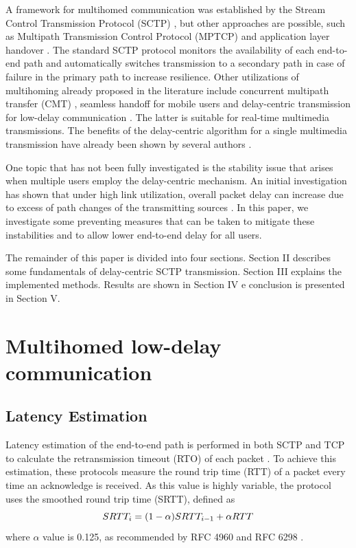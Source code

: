 \documentclass[letterpaper,10pt,oneside,conference,final]{sbrt2015}
\begin{document}
A framework for multihomed communication was established by the Stream Control Transmission Protocol (SCTP) \cite{Stewart2007a}, but other approaches are possible, such as Multipath Transmission Control Protocol (MPTCP) \cite{Ford2013}\cite{Zekri2012} and application layer handover \cite{Cunningham2004}. The standard SCTP protocol monitors the availability of each end-to-end path and automatically switches transmission to a secondary path in case of failure in the primary path to increase resilience. Other utilizations of multihoming already proposed in the literature include concurrent multipath transfer (CMT) \cite{Casetti2004}\cite{Ye2004}\cite{Iyengar2006}, seamless handoff for mobile users \cite{Koh2004}\cite{Ma2004} and delay-centric transmission for low-delay communication \cite{Kelly2004}\cite{Kashihara2004}. The latter is suitable for real-time multimedia transmissions.
The benefits of the delay-centric algorithm for a single multimedia transmission have already been shown by several authors \cite{Noonan2004b}\cite{Fitzpatrick2007}\cite{Gavriloff2009a}\cite{Runcos2010}. 

One topic that has not been fully investigated is the stability issue that arises when multiple users employ the delay-centric mechanism. An initial investigation has shown that under high link utilization, overall packet delay can increase due to excess of path changes of the transmitting sources \cite{Gavriloff2009}.
In this paper, we investigate some preventing measures that can be taken to mitigate these instabilities and to allow lower end-to-end delay for all users.

The remainder of this paper is divided into four sections. Section II describes some fundamentals of delay-centric SCTP transmission. Section III explains the implemented methods. Results are shown in Section IV e conclusion is presented in Section V.  

  \section{Multihomed low-delay communication}
  
  \subsection{Latency Estimation}

  Latency estimation of the end-to-end path is performed in both SCTP and TCP to calculate the retransmission timeout (RTO) of each packet \cite{Stewart2007a}\cite{Postel1981}. To achieve this estimation, these protocols measure the round trip time (RTT) of a packet every time an acknowledge is received. As this value is highly variable, the protocol uses the smoothed round trip time (SRTT), defined as
\begin{equation}
SRTT_i  = (1 - \alpha) SRTT_{i-1} + \alpha  RTT \\
\end{equation}
\noindent where $\alpha$ value is 0.125, as recommended by RFC 4960 \cite{Stewart2007a} and RFC 6298 \cite{Paxson2011}.
\end{document}
